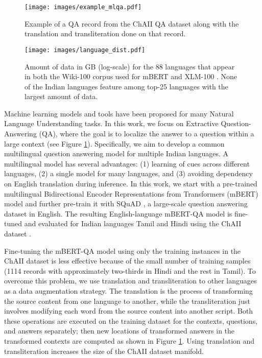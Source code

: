 \documentclass[11pt]{article}
\begin{document}
\begin{figure}[h]
\centering
   \texttt{[image: images/example\_mlqa.pdf]}
   \caption{Example of a QA record from the ChAII QA dataset along with the translation and transliteration done on that record.}
   \label{fig:example}
\end{figure}

\begin{figure*}[!ht]
\centering
   \texttt{[image: images/language\_dist.pdf]}
   \caption{Amount of data in GB (log-scale) for the 88 languages that appear in both the Wiki-100 \cite{wiki100} corpus used for mBERT and XLM-100 \cite{conneau2020unsupervised}. None of the Indian languages feature among top-25 languages with the largest amount of data.}
   \label{fig:XLM_lang}
\end{figure*}

Machine learning models and tools have been proposed for many Natural Language Understanding tasks. In this work, we focus on Extractive Question-Answering (QA), where the goal is to localize the answer to a question within a large context (see Figure \ref{fig:example}). Specifically, we aim to develop a common multilingual question answering model for multiple Indian languages. A multilingual model has several advantages: (1) learning of cues across different languages, (2) a single model for many languages, and (3) avoiding dependency on English translation during inference. In this work, we start with a pre-trained multilingual Bidirectional Encoder Representations from Transformers (mBERT) model and further pre-train it with SQuAD \cite{rajpurkar2016SQuAD}, a large-scale question answering dataset in English. The resulting English-language mBERT-QA model is fine-tuned and evaluated for Indian languages Tamil and Hindi using the ChAII dataset \cite{ChAII}.

\label{sec:trans}
Fine-tuning the mBERT-QA model using only the training instances in the ChAII dataset is less effective because of the small number of training samples (1114 records with approximately two-thirds in Hindi and the rest in Tamil). To overcome this problem, we use translation and transliteration to other languages as a data augmentation strategy. The translation is the process of transforming the source content from one language to another, while the transliteration just involves modifying each word from the source content into another script. Both these operations are executed on the training dataset for the contexts, questions, and answers separately; then new locations of transformed answers in the transformed contexts are computed as shown in Figure \ref{fig:example}. Using translation and transliteration increases the size of the ChAII dataset manifold.
\end{document}
